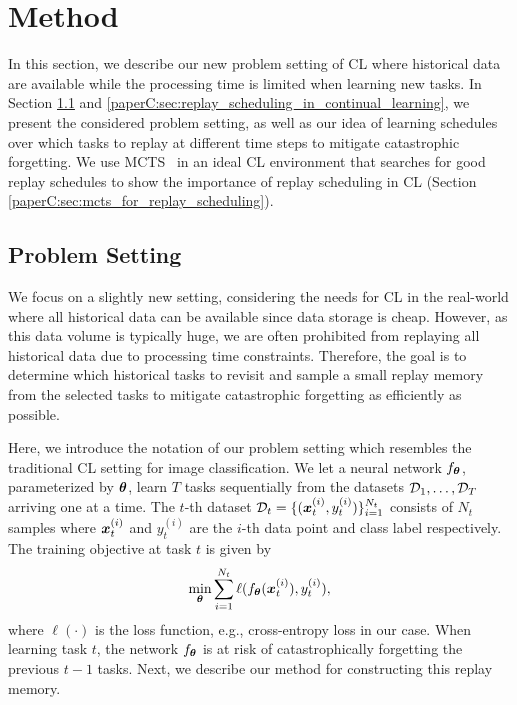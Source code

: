 
\section{Method}\label{paperC:sec:method}

In this section, we describe our new problem setting of CL where historical data are available while the processing time is limited when learning new tasks. 
In Section \ref{paperC:sec:problem_setting} and \ref{paperC:sec:replay_scheduling_in_continual_learning}, we present the considered problem setting, as well as our idea of learning schedules over which tasks to replay at different time steps to mitigate catastrophic forgetting.
We use MCTS~ in an ideal CL environment that searches for good replay schedules to show the importance of replay scheduling in CL (Section \ref{paperC:sec:mcts_for_replay_scheduling}). 


%
\subsection{Problem Setting}\label{paperC:sec:problem_setting}

We focus on a slightly new setting, considering the needs for CL in the real-world where all historical data can be available since data storage is cheap. 
However, as this data volume is typically huge, we are often prohibited from replaying all historical data due to processing time constraints. 
Therefore, the goal is to determine which historical tasks to revisit and sample a small replay memory from the selected tasks to mitigate catastrophic forgetting as efficiently as possible. 

\setlength{\abovedisplayskip}{0pt}
\setlength{\belowdisplayskip}{0pt}
\setlength{\abovedisplayshortskip}{0pt}
\setlength{\belowdisplayshortskip}{0pt}

Here, we introduce the notation of our problem setting which resembles the traditional CL setting for image classification. We let a neural network $f_{{\bm{\theta}}}$, parameterized by ${\bm{\theta}}$, learn $T$ tasks sequentially from the datasets ${\mathcal{D}}_1, \dots, {\mathcal{D}}_T$ arriving one at a time. 
The $t$-th dataset ${\mathcal{D}}_t = \{({\bm{x}}_{t}^{(i)}, y_{t}^{(i)})\}_{i=1}^{N_{t}}$ consists of $N_t$ samples where ${\bm{x}}_{t}^{(i)}$ and $y_{t}^{(i)}$ are the $i$-th data point and class label respectively. The training objective at task $t$ is given by 
\begin{align}
	\underset{{\bm{\theta}}}{\text{min}} \sum_{i=1}^{N_t} \ell(f_{{\bm{\theta}}}({\bm{x}}_t^{(i)}), y_{t}^{(i)}),
\end{align}
where $\ell(\cdot)$ is the loss function, e.g., cross-entropy loss in our case. 
When learning task $t$, the network $f_{{\bm{\theta}}}$ is at risk of catastrophically forgetting the previous $t-1$ tasks. Next, we describe our method for constructing this replay memory.  

